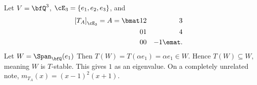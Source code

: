     \begin{example}
        Let $V = \bfQ^3$, $\cE_3 = \{e_1,e_2,e_3\}$, and 
            \begin{equation*}
            \begin{split}
                \left[T_A\right]_{\cE_3} = A = \bmat 1 & 2 & 3 \\  0 & 1 & 4 \\ 0 & 0 & -1 \emat.
            \end{split}
            \end{equation*}
        Let $W = \Span_\bfQ(e_1)$ Then $T(W) = T(\alpha e_1) = \alpha e_1 \in W$. Hence $T(W) \subseteq W$, meaning $W$ is $T$-stable. This gives $1$ as an eigenvalue. On a completely unrelated note, $m_{T_A}(x) = (x-1)^2(x+1)$.
    \end{example}

